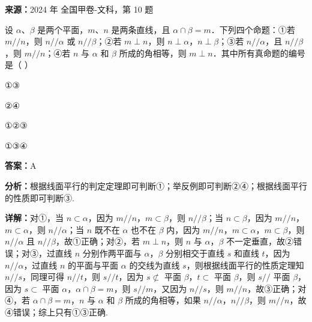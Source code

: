 \begin{question}[points=5]
\textbf{来源：}2024 年 全国甲卷-文科，第 10 题\par
设 $\alpha$、$\beta$ 是两个平面，$m$、$n$ 是两条直线，且 $\alpha \cap \beta = m$．下列四个命题：①若 $m // n$，则 $n // \alpha$ 或 $n // \beta$；②若 $m \perp n$，则 $n \perp \alpha$，$n \perp \beta$；③若 $n // \alpha$，且 $n // \beta$，则 $m // n$；④若 $n$ 与 $\alpha$ 和 $\beta$ 所成的角相等，则 $m \perp n$．其中所有真命题的编号是（ ）
\begin{choices}
  \item ①③
  \item ②④
  \item ①②③
  \item ①③④
\end{choices}
\begin{solution}
\textbf{答案：}A

\textbf{分析：}根据线面平行的判定定理即可判断①；举反例即可判断②④；根据线面平行的性质即可判断③.

\textbf{详解：}对①，当 $n \subset \alpha$，因为 $m // n$，$m \subset \beta$，则 $n // \beta$；当 $n \subset \beta$，因为 $m // n$，$m \subset \alpha$，则 $n // \alpha$；当 $n$ 既不在 $\alpha$ 也不在 $\beta$ 内，因为 $m // n$，$m \subset \alpha$，$m \subset \beta$，则 $n // \alpha$ 且 $n // \beta$，故①正确；对②，若 $m \perp n$，则 $n$ 与 $\alpha$，$\beta$ 不一定垂直，故②错误；对③，过直线 $n$ 分别作两平面与 $\alpha$，$\beta$ 分别相交于直线 $s$ 和直线 $t$，因为 $n // \alpha$，过直线 $n$ 的平面与平面 $\alpha$ 的交线为直线 $s$，则根据线面平行的性质定理知 $n // s$，同理可得 $n // t$，则 $s // t$，因为 $s \not\subset$ 平面 $\beta$，$t \subset$ 平面 $\beta$，则 $s //$ 平面 $\beta$，因为 $s \subset$ 平面 $\alpha$，$\alpha \cap \beta = m$，则 $s // m$，又因为 $n // s$，则 $m // n$，故③正确；对④，若 $\alpha \cap \beta = m$，$n$ 与 $\alpha$ 和 $\beta$ 所成的角相等，如果 $n // \alpha$，$n // \beta$，则 $m // n$，故④错误；综上只有①③正确.
\end{solution}
\end{question}

